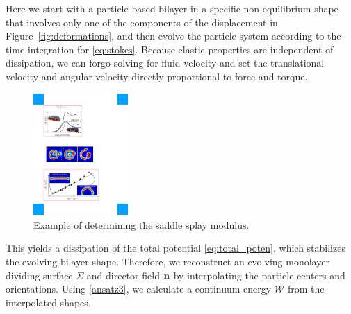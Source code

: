 Here we start with a particle-based bilayer in a specific non-equilibrium shape that involves only one of the components of the displacement in Figure~\ref{fig:deformations}, and then evolve the particle system according to the time integration for \eqref{eq:stokes}.
Because elastic properties are independent of dissipation,
we can forgo solving for fluid velocity and set the translational
velocity and angular velocity directly proportional to force and torque. 
%
\begin{figure}
\centerline{\includegraphics[width=0.32\textwidth]{Figures/SaddleSplayDiagram.pdf}}
  \vspace{-8pt}
\caption{\label{fig:saddle_splay} \footnotesize Example of determining the
  saddle splay modulus.}
\end{figure}
%
This yields a dissipation of the total potential \eqref{eq:total_poten}, which
stabilizes the evolving bilayer shape.
Therefore, we reconstruct an evolving monolayer dividing surface $\Sigma$ and director field ${\bf n}$ by
interpolating the particle centers and orientations. Using \eqref{ansatz3}, we calculate a continuum energy $\mathcal{W}$ from the interpolated shapes.

